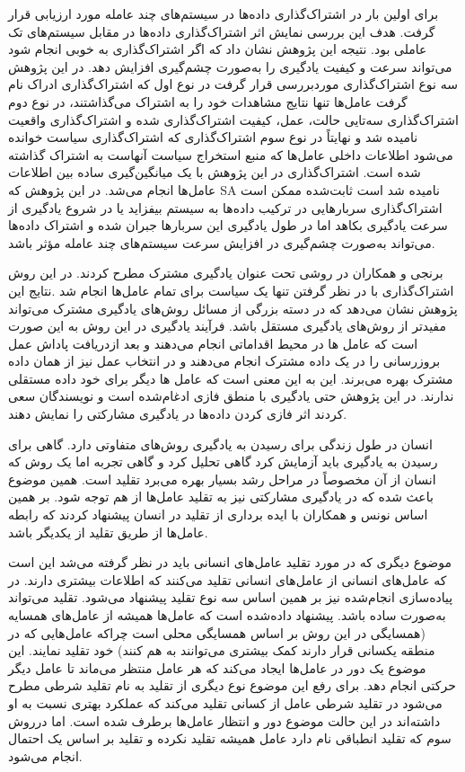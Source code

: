 برای اولین بار در اشتراک‌گذاری داده‌ها در سیستم‌های چند عامله مورد ارزیابی قرار گرفت. هدف این بررسی نمایش اثر اشتراک‌گذاری داده‌ها در مقابل سیستم‌های تک عاملی بود. نتیجه این پژوهش نشان داد که اگر اشتراک‌گذاری به خوبی انجام شود می‌تواند سرعت و کیفیت یادگیری را به‌صورت چشم‌گیری افزایش دهد. در این پژوهش سه نوع اشتراک‌گذاری موردبررسی قرار گرفت در نوع اول که اشتراک‌گذاری ادراک نام گرفت عامل‌ها تنها نتایج مشاهدات خود را به اشتراک می‌گذاشتند، در نوع دوم اشتراک‌گذاری سه‌تایی حالت، عمل، کیفیت اشتراک‌گذاری شده و اشتراک‌گذاری واقعیت نامیده شد و نهایتاً در نوع سوم اشتراک‌گذاری که اشتراک‌گذاری سیاست خوانده می‌شود اطلاعات داخلی عامل‌ها که منبع استخراج سیاست آنهاست به اشتراک گذاشته‌ شده است. اشتراک‌گذاری در این پژوهش با یک میانگین‌گیری ساده بین اطلاعات عامل‌ها انجام می‌شد. در این پژوهش که SA نامیده شد است ثابت‌شده ممکن است اشتراک‌گذاری سربارهایی در ترکیب داده‌ها به سیستم بیفزاید یا در شروع یادگیری از سرعت یادگیری بکاهد اما در طول یادگیری این سربارها جبران شده و اشتراک داده‌ها می‌تواند به‌صورت چشم‌گیری در افزایش سرعت سیستم‌های چند عامله مؤثر باشد.


برنجی و همکاران در  روشی تحت عنوان یادگیری مشترک مطرح کردند. در این روش اشتراک‌گذاری با در نظر گرفتن تنها یک سیاست برای تمام عامل‌ها انجام شد .نتایج این پژوهش نشان می‌دهد که در دسته بزرگی از مسائل روش‌های یادگیری مشترک می‌تواند مفیدتر از روش‌های یادگیری مستقل باشد. فرآیند یادگیری در این روش به این صورت است که عامل ها در محیط اقداماتی انجام می‌دهند و بعد ازدریافت پاداش عمل بروزرسانی را در یک داده مشترک انجام می‌دهند و در انتخاب عمل نیز از همان داده مشترک بهره می‌برند. این به این معنی است که عامل ها دیگر برای خود داده مستقلی ندارند. در این پژوهش حتی یادگیری با منطق فازی ادغام‌شده است و نویسندگان سعی کردند اثر فازی کردن داده‌ها در یادگیری مشارکتی را نمایش دهند.

انسان در طول زندگی برای رسیدن به یادگیری روش‌های متفاوتی دارد. گاهی برای رسیدن به یادگیری باید آزمایش کرد گاهی تحلیل کرد و گاهی تجربه اما یک روش که انسان از آن مخصوصاً در مراحل رشد بسیار بهره می‌برد تقلید است. همین موضوع باعث شده که در یادگیری مشارکتی نیز به تقلید عامل‌ها از هم توجه شود. بر همین اساس نونس و همکاران با ایده برداری از تقلید در انسان پیشنهاد کردند که رابطه عامل‌ها از طریق تقلید از یکدیگر باشد.

موضوع دیگری که در مورد تقلید عامل‌های انسانی باید در نظر گرفته می‌شد این است که عامل‌های انسانی از عامل‌های انسانی تقلید می‌کنند که اطلاعات بیشتری دارند. در پیاده‌سازی انجام‌شده نیز بر همین اساس سه نوع تقلید پیشنهاد می‌شود. تقلید می‌تواند به‌صورت ساده باشد. پیشنهاد داده‌شده است که عامل‌ها همیشه از عامل‌های همسایه (همسایگی در این روش بر اساس همسایگی محلی است چراکه عامل‌هایی که در منطقه یکسانی قرار دارند کمک بیشتری می‌توانند به هم کنند) خود تقلید نمایند. این موضوع یک دور در عامل‌ها ایجاد می‌کند که هر عامل منتظر می‌ماند تا عامل دیگر حرکتی انجام دهد. برای رفع این موضوع نوع دیگری از تقلید به نام تقلید شرطی مطرح می‌شود در تقلید شرطی عامل از کسانی تقلید می‌کند که عملکرد بهتری نسبت به او داشته‌اند در این حالت موضوع دور و انتظار عامل‌ها برطرف شده است. اما درروش سوم که تقلید انطباقی نام دارد عامل همیشه تقلید نکرده و تقلید بر اساس یک احتمال انجام می‌شود.

